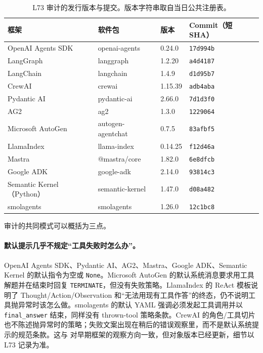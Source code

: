 \documentclass[11pt,a4paper]{article}
\begin{document}
\begin{table}[ht]
\centering
\caption{L73 审计的发行版本与提交。版本字符串取自当日公共注册表。}
\label{tab:fwver}
\small
\begin{tabular}{llll}
\toprule
框架 & 软件包 & 版本 & Commit（短 SHA） \\
\midrule
OpenAI Agents SDK & openai-agents & 0.24.0 & \texttt{17d994b} \\
LangGraph & langgraph & 1.2.20 & \texttt{a4d4187} \\
LangChain & langchain & 1.4.9 & \texttt{d1d95b7} \\
CrewAI & crewai & 1.15.39 & \texttt{adb4aba} \\
Pydantic AI & pydantic-ai & 2.66.0 & \texttt{7d1d3f0} \\
AG2 & ag2 & 1.3.0 & \texttt{1229064} \\
Microsoft AutoGen & autogen-agentchat & 0.7.5 & \texttt{83afbf5} \\
LlamaIndex & llama-index & 0.14.25 & \texttt{f12d46a} \\
Mastra & @mastra/core & 1.82.0 & \texttt{6e8dfcb} \\
Google ADK & google-adk & 2.14.0 & \texttt{93814c3} \\
Semantic Kernel（Python） & semantic-kernel & 1.47.0 & \texttt{d08a482} \\
smolagents & smolagents & 1.26.0 & \texttt{12c1bc8} \\
\bottomrule
\end{tabular}
\end{table}

审计的共同模式可以概括为三点。

\paragraph{默认提示几乎不规定“工具失败时怎么办”。}
OpenAI Agents SDK、Pydantic AI、AG2、Mastra、Google ADK、Semantic Kernel 的默认指令为空或 \texttt{None}。Microsoft AutoGen 的默认系统消息要求用工具解题并在结束时回复 \texttt{TERMINATE}，但没有失败策略。LlamaIndex 的 ReAct 模板说明了 Thought/Action/Observation 和“无法用现有工具作答”的终态，仍不说明工具抛异常时该怎么做。smolagents 的默认 YAML 强调必须发起工具调用并以 \texttt{final\_answer} 结束，同样没有 thrown-tool 策略条款。CrewAI 的角色/工具切片也不陈述抛异常时的策略；失败文案出现在稍后的错误观察里，而不是默认系统提示的规范条款。这与 \cite{fatf2026} 对早期框架的观察方向一致，但对象版本已经更新，细节以 L73 记录为准。
\end{document}
